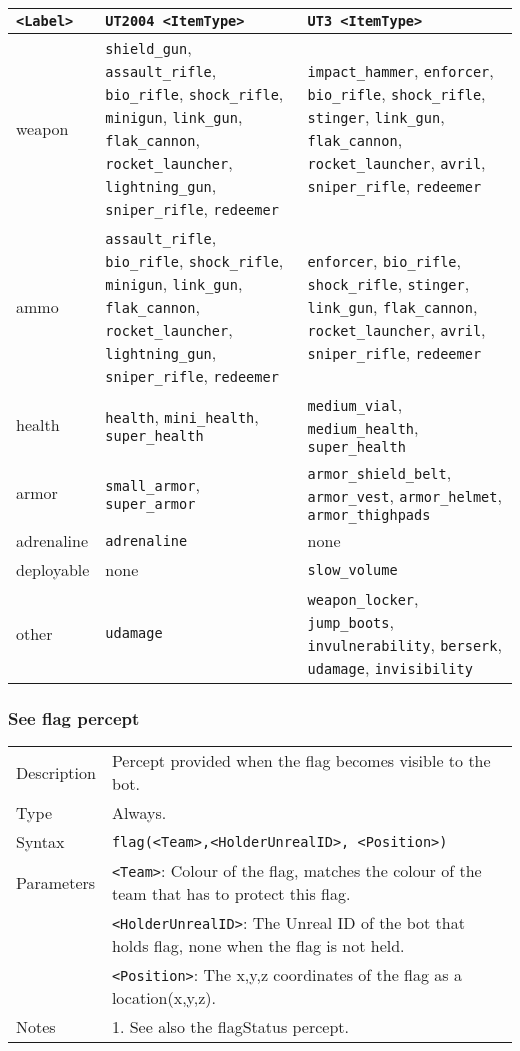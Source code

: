 \documentclass[11pt,a4paper]{article}
\begin{document}
\begin{small}
\begin{tabular}{|p{2cm}|p{6cm}|p{6cm}|}	
	\hline
\verb|<Label>| & \verb|UT2004 <ItemType>| & \verb|UT3 <ItemType>|\\
\hline
weapon &
\verb|shield_gun|, \verb|assault_rifle|, \verb|bio_rifle|, \verb|shock_rifle|, \verb|minigun|, \verb|link_gun|, \verb|flak_cannon|, \verb|rocket_launcher|, \verb|lightning_gun|, \verb|sniper_rifle|, \verb|redeemer| &
\verb|impact_hammer|, \verb|enforcer|, \verb|bio_rifle|, \verb|shock_rifle|, \verb|stinger|, \verb|link_gun|, \verb|flak_cannon|, \verb|rocket_launcher|, \verb|avril|, \verb|sniper_rifle|, \verb|redeemer| \\
ammo &
\verb|assault_rifle|, \verb|bio_rifle|, \verb|shock_rifle|, \verb|minigun|, \verb|link_gun|, \verb|flak_cannon|, \verb|rocket_launcher|, \verb|lightning_gun|, \verb|sniper_rifle|, \verb|redeemer| &
\verb|enforcer|, \verb|bio_rifle|, \verb|shock_rifle|, \verb|stinger|, \verb|link_gun|, \verb|flak_cannon|, \verb|rocket_launcher|, \verb|avril|, \verb|sniper_rifle|, \verb|redeemer| \\
health & \verb|health|, \verb|mini_health|, \verb|super_health| & \verb|medium_vial|, \verb|medium_health|, \verb|super_health|\\
armor & \verb|small_armor|, \verb|super_armor| & \verb|armor_shield_belt|, \verb|armor_vest|, \verb|armor_helmet|, \verb|armor_thighpads|\\
adrenaline & \verb|adrenaline| & none\\
deployable & none & \verb|slow_volume|\\
other & \verb|udamage| & \verb|weapon_locker|, \verb|jump_boots|, \verb|invulnerability|, \verb|berserk|, \verb|udamage|, \verb|invisibility| \\
 \hline
\end{tabular}
\end{small}


\subsubsection*{See flag percept}
\begin{small}
\begin{tabular}{p{2cm}p{9cm}}
Description & Percept provided when the flag becomes visible to the bot. \\
Type & Always.\\
Syntax & \verb|flag(<Team>,<HolderUnrealID>, <Position>)|\\
Parameters & 
	\verb|<Team>|: Colour of the flag, matches the colour of the team that has to protect this flag.\\
& \verb|<HolderUnrealID>|: The Unreal ID of the bot that holds flag, none when the flag is not held.\\
& \verb|<Position>|: The x,y,z coordinates of the flag as a location(x,y,z).\\

Notes &
	1.	See also the flagStatus percept.
\end{tabular}
\end{small}
\end{document}
